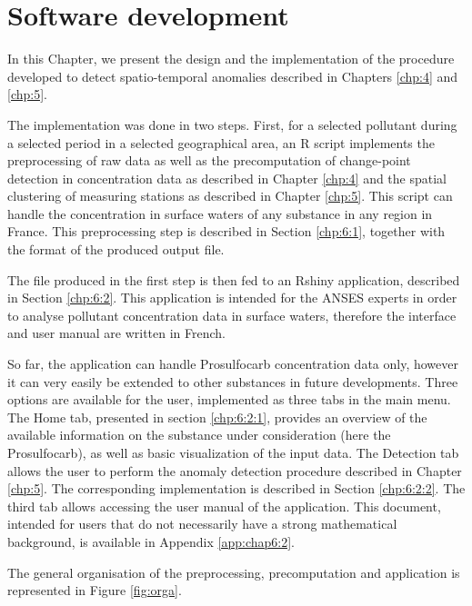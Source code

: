 \chapter{Software development}\label{chp:6}

\minitoc

\clearpage


In this Chapter, we present the design and the implementation of the procedure developed to detect spatio-temporal anomalies described in Chapters \ref{chp:4} and \ref{chp:5}.


The implementation was done in two steps. First, for a selected pollutant during a selected period in a selected geographical area, an R script implements the preprocessing of raw data as well as the precomputation of change-point detection in concentration data as described in Chapter \ref{chp:4} and the spatial clustering of measuring stations as described in Chapter \ref{chp:5}. This script can handle the concentration in surface waters of any substance in any region in France. This preprocessing step is described in Section \ref{chp:6:1}, together with the format of the produced output file.

The file produced in the first step is then fed to an Rshiny application, described in Section \ref{chp:6:2}. This application is intended for the ANSES experts in order to analyse pollutant concentration data in surface waters, therefore the interface and user manual are written in French. 

So far, the application can handle Prosulfocarb concentration data only, however it can very easily be extended to other substances in future developments. Three options are available for the user, implemented as three tabs in the main menu. The Home tab, presented in section \ref{chp:6:2:1}, provides an overview of the available information on the substance under consideration (here the Prosulfocarb), as well as basic visualization of the input data. The Detection tab allows the user to perform the anomaly detection procedure described in Chapter \ref{chp:5}. The corresponding implementation is described in Section \ref{chp:6:2:2}. The third tab allows accessing the user manual of the application. This document, intended for users that do not necessarily have a strong mathematical background, is available in Appendix \ref{app:chap6:2}. 

The general organisation of the preprocessing, precomputation and application is represented in Figure \ref{fig:orga}.

